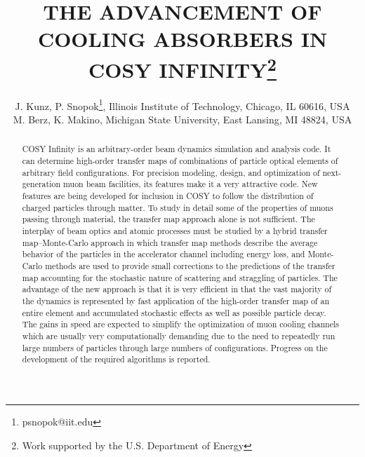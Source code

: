 \documentclass{jacow}
\begin{document}
\title{THE ADVANCEMENT OF COOLING ABSORBERS IN COSY INFINITY\thanks{Work supported by the U.S. Department of Energy}}

\author{J. Kunz, P. Snopok\thanks{psnopok@iit.edu}, Illinois Institute of Technology, Chicago, IL 60616, USA \\
M. Berz, K. Makino, Michigan State University, East Lansing, MI 48824, USA}

\maketitle

\begin{abstract}
COSY Infinity is an arbitrary-order beam dynamics simulation and analysis code. It can determine high-order transfer maps of combinations of particle optical elements of arbitrary field configurations. For precision modeling, design, and optimization of next-generation muon beam facilities, its features make it a very attractive code. New features are being developed for inclusion in COSY to follow the distribution of charged particles through matter. To study in detail some of the properties of muons passing through material, the transfer map approach alone is not sufficient. The interplay of beam optics and atomic processes must be studied by a hybrid transfer map--Monte-Carlo approach in which transfer map methods describe the average behavior of the particles in the accelerator channel including energy loss, and Monte-Carlo methods are used to provide small corrections to the predictions of the transfer map accounting for the stochastic nature of scattering and straggling of particles. The advantage of the new approach is that it is very efficient in that the vast majority of the dynamics is represented by fast application of the high-order transfer map of an entire element and accumulated stochastic effects as well as possible particle decay. The gains in speed are expected to simplify the optimization of muon cooling channels which are usually very computationally demanding due to the need to repeatedly run large numbers of particles through large numbers of configurations. Progress on the development of the required algorithms is reported.
\end{abstract}
\end{document}
